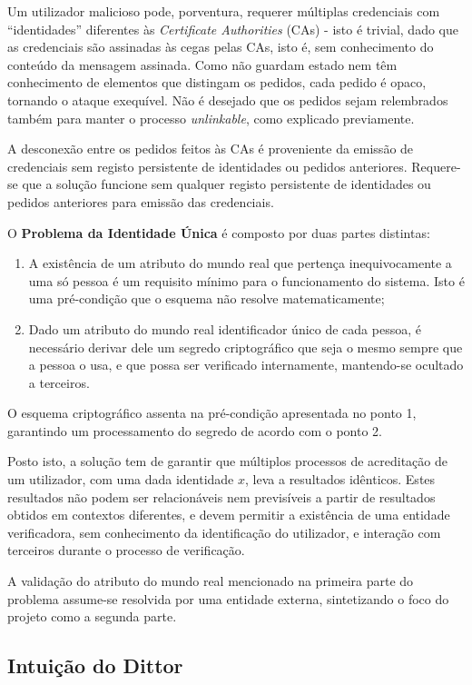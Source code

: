 Um utilizador malicioso pode, porventura, requerer múltiplas credenciais com “identidades” diferentes às \textit{Certificate Authorities} (CAs) - isto é trivial, dado que as credenciais são assinadas às cegas pelas CAs, isto é, sem conhecimento do conteúdo da mensagem assinada. Como não guardam estado nem têm conhecimento de elementos que distingam os pedidos, cada pedido é opaco, tornando o ataque exequível. Não é desejado que os pedidos sejam relembrados também para manter o processo \textit{unlinkable}, como explicado previamente.

A desconexão entre os pedidos feitos às CAs é proveniente da emissão de credenciais sem registo persistente de identidades ou pedidos anteriores. Requere-se que a solução funcione sem qualquer registo persistente de identidades ou pedidos anteriores para emissão das credenciais.

O \textbf{Problema da Identidade Única} é composto por duas partes distintas:

\begin{enumerate}
    \item A existência de um atributo do mundo real que pertença inequivocamente a uma só pessoa é um requisito mínimo para o funcionamento do sistema. Isto é uma pré-condição que o esquema não resolve matematicamente;
    \item Dado um atributo do mundo real identificador único de cada pessoa, é necessário derivar dele um segredo criptográfico que seja o mesmo sempre que a pessoa o usa, e que possa ser verificado internamente, mantendo-se ocultado a terceiros.
\end{enumerate}

O esquema criptográfico assenta na pré-condição apresentada no ponto 1, garantindo um processamento do segredo de acordo com o ponto 2.

Posto isto, a solução tem de garantir que múltiplos processos de acreditação de um utilizador, com uma dada identidade $x$, leva a resultados idênticos. Estes resultados não podem ser relacionáveis nem previsíveis a partir de resultados obtidos em contextos diferentes, e devem permitir a existência de uma entidade verificadora, sem conhecimento da identificação do utilizador, e interação com terceiros durante o processo de verificação.

A validação do atributo do mundo real mencionado na primeira parte do problema assume-se resolvida por uma entidade externa, sintetizando o foco do projeto como a segunda parte.

\subsection{Intuição do Dittor}
\label{sub:dittor_intuicao}

